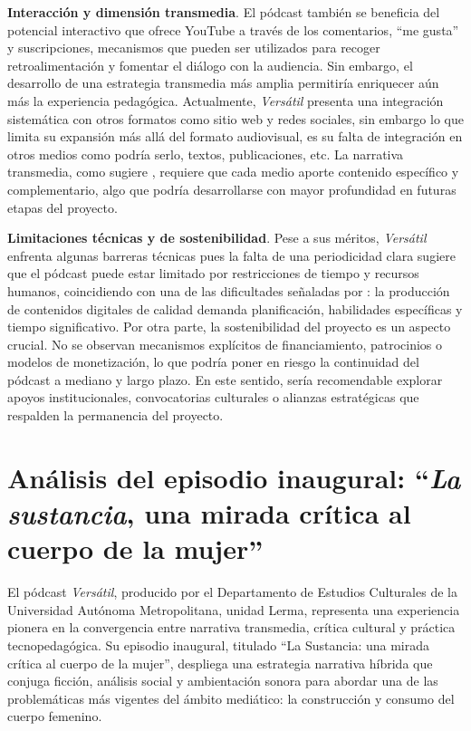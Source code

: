\documentclass[
  spanish,
  11pt,
  a4paper,
]{scrbook}
\begin{document}
\textbf{Interacción y dimensión transmedia}. El pódcast también se
beneficia del potencial interactivo que ofrece YouTube a través de los
comentarios, ``me gusta'' y suscripciones, mecanismos que pueden ser
utilizados para recoger retroalimentación y fomentar el diálogo con la
audiencia. Sin embargo, el desarrollo de una estrategia transmedia más
amplia permitiría enriquecer aún más la experiencia pedagógica.
Actualmente, \emph{Versátil} presenta una integración sistemática con
otros formatos como sitio web y redes sociales, sin embargo lo que
limita su expansión más allá del formato audiovisual, es su falta de
integración en otros medios como podría serlo, textos, publicaciones,
etc. La narrativa transmedia, como sugiere \textcite{Scolari2013},
requiere que cada medio aporte contenido específico y complementario,
algo que podría desarrollarse con mayor profundidad en futuras etapas
del proyecto.

\textbf{Limitaciones técnicas y de sostenibilidad}. Pese a sus méritos,
\emph{Versátil} enfrenta algunas barreras técnicas pues la falta de una
periodicidad clara sugiere que el pódcast puede estar limitado por
restricciones de tiempo y recursos humanos, coincidiendo con una de las
dificultades señaladas por \textcite{McLoughlin2010}: la producción de
contenidos digitales de calidad demanda planificación, habilidades
específicas y tiempo significativo. Por otra parte, la sostenibilidad
del proyecto es un aspecto crucial. No se observan mecanismos explícitos
de financiamiento, patrocinios o modelos de monetización, lo que podría
poner en riesgo la continuidad del pódcast a mediano y largo plazo. En
este sentido, sería recomendable explorar apoyos institucionales,
convocatorias culturales o alianzas estratégicas que respalden la
permanencia del proyecto.

\section*{\texorpdfstring{Análisis del episodio inaugural: ``\emph{La
sustancia}, una mirada crítica al cuerpo de la
mujer''}{Análisis del episodio inaugural: ``La sustancia, una mirada crítica al cuerpo de la mujer''}}\label{anuxe1lisis-del-episodio-inaugural-la-sustancia-una-mirada-cruxedtica-al-cuerpo-de-la-mujer}


El pódcast \emph{Versátil}, producido por el Departamento de Estudios
Culturales de la Universidad Autónoma Metropolitana, unidad Lerma,
representa una experiencia pionera en la convergencia entre narrativa
transmedia, crítica cultural y práctica tecnopedagógica. Su episodio
inaugural, titulado ``La Sustancia: una mirada crítica al cuerpo de la
mujer'', despliega una estrategia narrativa híbrida que conjuga ficción,
análisis social y ambientación sonora para abordar una de las
problemáticas más vigentes del ámbito mediático: la construcción y
consumo del cuerpo femenino.
\end{document}
